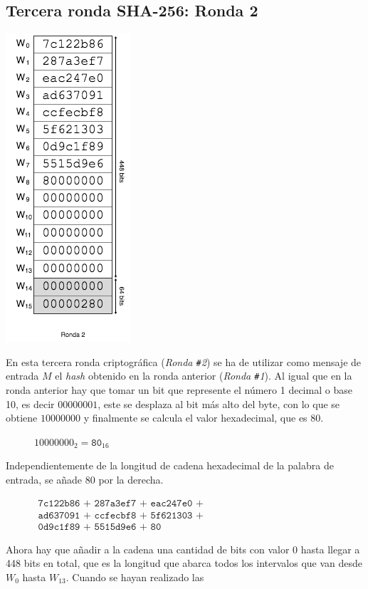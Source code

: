 \documentclass{article}
\begin{document}
    \subsection{Tercera ronda SHA-256: Ronda 2}
    \noindent\begin{minipage}{0.23\textwidth}
    \includegraphics[scale=0.59]{img/Bitcoin_block_SHA_256_W0_W15_ronda_2}
    \end{minipage}
    \hfill
    \begin{minipage}{0.67\textwidth}
    En esta tercera ronda criptográfica (\textit{Ronda \texttt{\#}2}) se ha de utilizar como mensaje de entrada $M$ el \textit{hash} obtenido en la ronda anterior (\textit{Ronda \texttt{\#}1}). Al igual que en la ronda anterior hay que tomar un bit que represente el número 1 decimal o base 10, es decir $00000001$, este se desplaza al bit más alto del byte, con lo que se obtiene $10000000$ y finalmente se calcula el valor hexadecimal, que es $80$.
        \begin{figure}[H]
        \centering
            $10000000_{2} = \texttt{80}_{16}$
        \end{figure}
    Independientemente de la longitud de cadena hexadecimal de la palabra de entrada, se añade $80$ por la derecha.
    \begin{figure}[H]
    \centering
        $\begin{array}{l}
            \texttt{7c122b86 + 287a3ef7 + eac247e0 +} \\
            \texttt{ad637091 + ccfecbf8 + 5f621303 +} \\
            \texttt{0d9c1f89 + 5515d9e6 + 80 }
        \end{array}$
    \end{figure}
    Ahora hay que añadir a la cadena una cantidad de bits con valor $0$ hasta llegar a 448 bits en total, que es la longitud que abarca todos los intervalos que van desde $W_{0}$ hasta $W_{13}$. Cuando se hayan realizado las
    \end{minipage}
    
\end{document}

